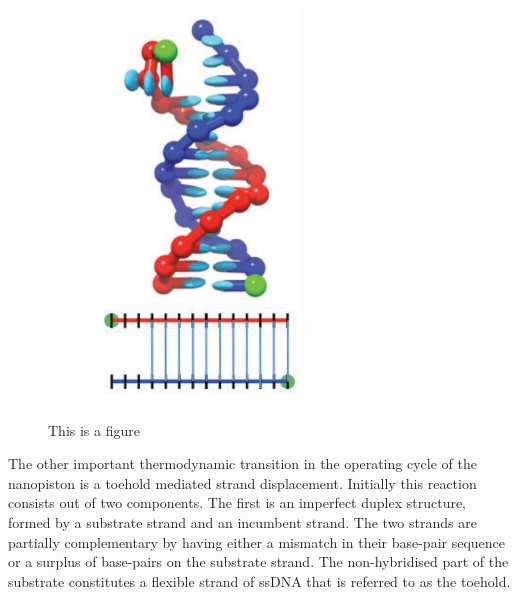 \begin{figure}[ht]
\begin{centering}
\begin{subfigure}[t]{\dimexpr.2\linewidth-1.3em\relax}
  \includegraphics[width=.8\linewidth,valign=t]{Figures/hybridDiag5.png}
  \end{subfigure}
  \caption{This is a figure \cite{Ouldridge2013}}
  \label{fig:hybridization}
  \end{centering}

\end{figure}

The other important thermodynamic transition in the operating cycle of the nanopiston
is a toehold mediated strand displacement. Initially this reaction consists out of two
components. The first is an imperfect duplex structure, formed by a substrate strand and
an incumbent strand. The two strands are partially complementary by having either a
mismatch in their base-pair sequence or a surplus of base-pairs on the substrate strand.
The non-hybridised part of the substrate constitutes a flexible strand of ssDNA
that is referred to as the toehold.

